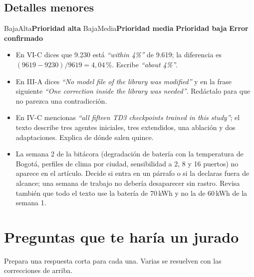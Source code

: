 \documentclass[11pt]{article}
\newcommand{\prioridad}[1]{%
  \def\tmpA{Alta}\def\tmpM{Media}\def\tmp{#1}%
  \ifx\tmp\tmpA\colorbox{rojoerror}{\color{white}\small\bfseries Prioridad alta}%
  \else\ifx\tmp\tmpM\colorbox{naranjatarea}{\color{white}\small\bfseries Prioridad media}%
  \else\colorbox{azulidea}{\color{white}\small\bfseries Prioridad baja}\fi\fi}
\newcommand{\confirmado}{\colorbox{rojoerror!15}{\small\bfseries\color{rojoerror} Error confirmado}}
\begin{document}
\subsection{Detalles menores}
\prioridad{Baja} \confirmado

\begin{itemize}[leftmargin=1.2em]
\item En VI-C dices que 9.230 está \foreignlanguage{english}{\emph{``within 4\%''}} de 9.619; la diferencia es $(9619-9230)/9619 = 4{,}04$\,\%. Escribe \foreignlanguage{english}{\emph{``about 4\%''}}.
\item En III-A dices \foreignlanguage{english}{\emph{``No model file of the library was modified''}} y en la frase siguiente \foreignlanguage{english}{\emph{``One correction inside the library was needed''}}. Redáctalo para que no parezca una contradicción.
\item En IV-C mencionas \foreignlanguage{english}{\emph{``all fifteen TD3 checkpoints trained in this study''}}; el texto describe tres agentes iniciales, tres extendidos, una ablación y dos adaptaciones. Explica de dónde salen quince.
\item La semana 2 de la bitácora (degradación de batería con la temperatura de Bogotá, perfiles de clima por ciudad, sensibilidad a 2, 8 y 16 puertos) no aparece en el artículo. Decide si entra en un párrafo o si la declaras fuera de alcance; una semana de trabajo no debería desaparecer sin rastro. Revisa también que todo el texto use la batería de 70\,kWh y no la de 60\,kWh de la semana 1.
\end{itemize}

\section{Preguntas que te haría un jurado}

Prepara una respuesta corta para cada una. Varias se resuelven con las correcciones de arriba.
\end{document}
